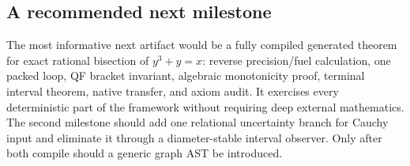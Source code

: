 \subsection{A recommended next milestone}

The most informative next artifact would be a fully compiled generated theorem for exact rational bisection of \(y^3+y=x\): reverse precision/fuel calculation, one packed loop, QF bracket invariant, algebraic monotonicity proof, terminal interval theorem, native transfer, and axiom audit.  It exercises every deterministic part of the framework without requiring deep external mathematics.  The second milestone should add one relational uncertainty branch for Cauchy input and eliminate it through a diameter-stable interval observer.  Only after both compile should a generic graph AST be introduced.
